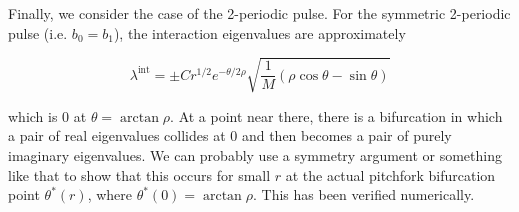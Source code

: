 \documentclass[thesis.tex]{subfiles}
\begin{document}
Finally, we consider the case of the 2-periodic pulse. For the symmetric 2-periodic pulse (i.e. $b_0 = b_1$), the interaction eigenvalues are approximately

\[
\lambda^{\text{int}} = \pm C r^{1/2} e^{-\theta/2\rho} \sqrt{ \frac{1}{M} \left( \rho \cos \theta - \sin \theta \right) }
\]

which is 0 at $\theta = \arctan \rho$. At a point near there, there is a bifurcation in which a pair of real eigenvalues collides at 0 and then becomes a pair of purely imaginary eigenvalues. We can probably use a symmetry argument or something like that to show that this occurs for small $r$ at the actual pitchfork bifurcation point $\theta^*(r)$, where $\theta^*(0) = \arctan \rho$. This has been verified numerically.

\iffulldocument\else
	
	
\fi
\end{document}
